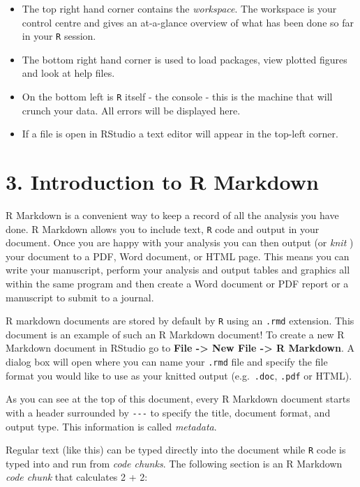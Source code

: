 \documentclass[
]{article}
\begin{document}
\begin{itemize}
\item
  The top right hand corner contains the \emph{workspace}. The workspace
  is your control centre and gives an at-a-glance overview of what has
  been done so far in your \texttt{R} session.
\item
  The bottom right hand corner is used to load packages, view plotted
  figures and look at help files.
\item
  On the bottom left is \texttt{R} itself - the console - this is the
  machine that will crunch your data. All errors will be displayed here.
\item
  If a file is open in RStudio a text editor will appear in the top-left
  corner.
\end{itemize}

\hypertarget{introduction-to-r-markdown}{%
\section{3. Introduction to R
Markdown}\label{introduction-to-r-markdown}}

R Markdown is a convenient way to keep a record of all the analysis you
have done. R Markdown allows you to include text, \texttt{R} code and
output in your document. Once you are happy with your analysis you can
then output (or \emph{knit} ) your document to a PDF, Word document, or
HTML page. This means you can write your manuscript, perform your
analysis and output tables and graphics all within the same program and
then create a Word document or PDF report or a manuscript to submit to a
journal.

R markdown documents are stored by default by \texttt{R} using an
\texttt{.rmd} extension. This document is an example of such an R
Markdown document! To create a new R Markdown document in RStudio go to
\textbf{File -\textgreater{} New File -\textgreater{} R Markdown}. A
dialog box will open where you can name your \texttt{.rmd} file and
specify the file format you would like to use as your knitted output
(e.g.~\texttt{.doc}, \texttt{.pdf} or HTML).

As you can see at the top of this document, every R Markdown document
starts with a header surrounded by \texttt{-\/-\/-} to specify the
title, document format, and output type. This information is called
\emph{metadata}.

Regular text (like this) can be typed directly into the document while
\texttt{R} code is typed into and run from \emph{code chunks}. The
following section is an R Markdown \emph{code chunk} that calculates 2 +
2:
\end{document}

